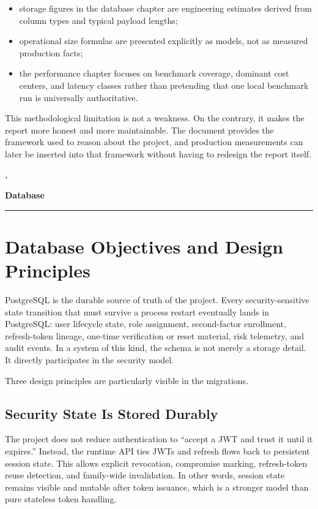 \documentclass[11pt,a4paper]{article}
\newcommand{\reportpart}[1]{%
  \clearpage
  \refstepcounter{part}%
  \addcontentsline{toc}{part}{\thepart.\enspace #1}%
  \thispagestyle{plain}%
  \begin{center}
    \vspace*{2.0cm}
    {\Huge\bfseries \thepart.\par}
    \vspace{0.35cm}
    {\huge\bfseries #1\par}
    \vspace{0.45cm}
    \rule{0.42\linewidth}{0.7pt}\par
    \vspace{0.8cm}
  \end{center}
}
\begin{document}
\begin{itemize}
  \item storage figures in the database chapter are engineering estimates derived from column types and typical payload lengths;
  \item operational size formulas are presented explicitly as models, not as measured production facts;
  \item the performance chapter focuses on benchmark coverage, dominant cost centers, and latency classes rather than pretending that one local benchmark run is universally authoritative.
\end{itemize}

This methodological limitation is not a weakness. On the contrary, it makes the report more honest and more maintainable. The document provides the framework used to reason about the project, and production measurements can later be inserted into that framework without having to redesign the report itself.

\reportpart{Database}

\section{Database Objectives and Design Principles}

PostgreSQL is the durable source of truth of the project. Every security-sensitive state transition that must survive a process restart eventually lands in PostgreSQL: user lifecycle state, role assignment, second-factor enrollment, refresh-token lineage, one-time verification or reset material, risk telemetry, and audit events. In a system of this kind, the schema is not merely a storage detail. It directly participates in the security model.

Three design principles are particularly visible in the migrations.

\subsection{Security State Is Stored Durably}

The project does not reduce authentication to ``accept a JWT and trust it until it expires.'' Instead, the runtime API ties JWTs and refresh flows back to persistent session state. This allows explicit revocation, compromise marking, refresh-token reuse detection, and family-wide invalidation. In other words, session state remains visible and mutable after token issuance, which is a stronger model than pure stateless token handling.
\end{document}
